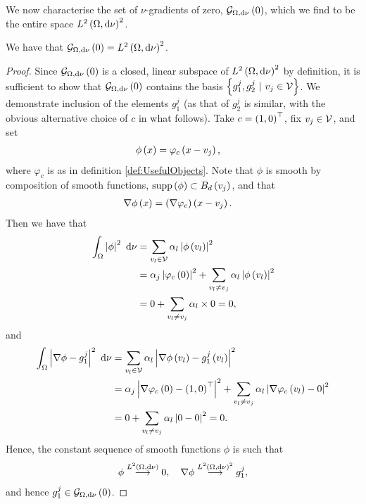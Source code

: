 We now characterise the set of $\nu$-gradients of zero, $\mathcal{G}_{ \Omega, \mathrm{d}\nu}\left( 0 \right)$, which we find to be the entire space $L^{2}\left( \Omega,\mathrm{d}\nu \right)^2$.
\begin{prop} \label{prop:CharPointMassGradZero}
	We have that $\mathcal{G}_{ \Omega, \mathrm{d}\nu}\left( 0 \right) = L^{2}\left( \Omega,\mathrm{d}\nu \right)^2$.
\end{prop}
\begin{proof}
	Since $\mathcal{G}_{ \Omega, \mathrm{d}\nu}\left( 0 \right)$ is a closed, linear subspace of $L^{2}\left( \Omega,\mathrm{d}\nu \right)^2$ by definition, it is sufficient to show that $\mathcal{G}_{ \Omega, \mathrm{d}\nu}\left( 0 \right)$ contains the basis $\clbracs{g_1^j, g_2^j \ \vert \ v_j\in\vertSet}$.
	We demonstrate inclusion of the elements $g^j_1$ (as that of $g^j_2$ is similar, with the obvious alternative choice of $c$ in what follows).
	Take $c=\left( 1,0 \right)^{\top}$, fix $v_j\in\mathcal{V}$, and set
	\begin{align*}
		\phi\left( x \right) &= \varphi_c\left( x-v_j \right),
	\end{align*}
	where $\varphi_c$ is as in definition \ref{def:UsefulObjects}.
	Note that $\phi$ is smooth by composition of smooth functions, $\mathrm{supp}\left( \phi \right)\subset B_{d}\left( v_j \right)$, and that
	\begin{align*}
		\nabla\phi\left( x \right) &= \left( \nabla\varphi_c \right)\left( x-v_j \right).
	\end{align*}
	Then we have that
	\begin{align*}
		\int_{\Omega}\left\lvert \phi \right\rvert^2 \ \mathrm{d}\nu &= \sum_{v_l\in\mathcal{V}} \alpha_l\left\lvert \phi\left( v_l \right) \right\rvert^2 \\
		&= \alpha_j\left\lvert \varphi_c\left( 0 \right) \right\rvert^2 + \sum_{v_l\neq v_j}\alpha_l\left\lvert \phi\left( v_l \right) \right\rvert^2 \\
		&= 0 + \sum_{v_l\neq v_j} \alpha_l \times 0 = 0,
	\end{align*}
	and
	\begin{align*}
		\int_{\Omega}\left\lvert \nabla\phi - g^j_1 \right\rvert^2 \ \mathrm{d}\nu &= \sum_{v_l\in\mathcal{V}} \alpha_l\left\lvert \nabla\phi\left( v_l \right) - g^j_1\left( v_l \right) \right\rvert^2 \\
		&= \alpha_j\left\lvert \nabla\varphi_c\left( 0 \right) - \left( 1,0 \right)^{\top} \right\rvert^2 + \sum_{v_l\neq v_j} \alpha_l\left\lvert \nabla\varphi_c\left( v_l \right) - 0 \right\rvert^2 \\
		&= 0 + \sum_{v_l\neq v_j} \alpha_l\left\lvert 0 - 0 \right\rvert^2 = 0.
	\end{align*}
	Hence, the constant sequence of smooth functions $\phi$ is such that
	\begin{align*}
		\phi\overset{L^{2}\left( \Omega,\mathrm{d}\nu \right)}{\longrightarrow}0, \quad \nabla\phi\overset{L^{2}\left( \Omega,\mathrm{d}\nu \right)^2}{\longrightarrow} g^j_1,
	\end{align*}
	and hence $g^j_1\in\mathcal{G}_{ \Omega, \mathrm{d}\nu}\left( 0 \right)$.
\end{proof}

